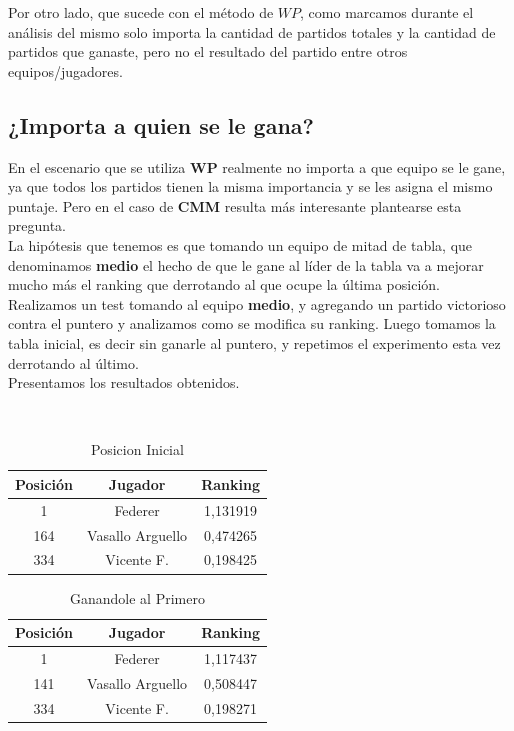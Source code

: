 Por otro lado, que sucede con el método de $WP$, como marcamos durante el análisis del mismo solo importa la cantidad de partidos totales y la cantidad de partidos que ganaste, pero no el resultado del partido entre otros equipos/jugadores.

\subsection{¿Importa a quien se le gana?}

En el escenario que se utiliza \textbf{WP} realmente no importa a que equipo se le gane, ya que todos los partidos tienen la misma importancia y se les asigna el mismo puntaje. Pero en el caso de \textbf{CMM} resulta más interesante plantearse esta pregunta. \\

La hipótesis que tenemos es que tomando un equipo de mitad de tabla, que denominamos \textbf{medio} el hecho de que le gane al líder de la tabla va a mejorar mucho más el ranking que derrotando al que ocupe la última posición. \\

Realizamos un test tomando al equipo \textbf{medio}, y agregando un partido victorioso contra el puntero y analizamos como se modifica su ranking. Luego tomamos la tabla inicial, es decir sin ganarle al puntero, y repetimos el experimento esta vez derrotando al último. \\

Presentamos los resultados obtenidos.

\\

\begin{table}[H]
\caption{Posicion Inicial}
\centering
\begin{tabular}{c c c}
\hline \hline
    Posición & Jugador & Ranking \\ 
    \hline
    1 & Federer & 1,131919 \\ 
    164 & Vasallo Arguello & 0,474265 \\ 
    334 & Vicente F. & 0,198425 \\ 
    \end{tabular}
\end{table}

\begin{table}[H]
        \caption{Ganandole al Primero}
\centering
\begin{tabular}{c c c}
\hline \hline
    Posición & Jugador & Ranking \\ 
    \hline
    1 & Federer & 1,117437 \\ 
    141 & Vasallo Arguello & 0,508447 \\ 
    334 & Vicente F. & 0,198271 \\ 
    \hline
    \end{tabular}
\end{table}

